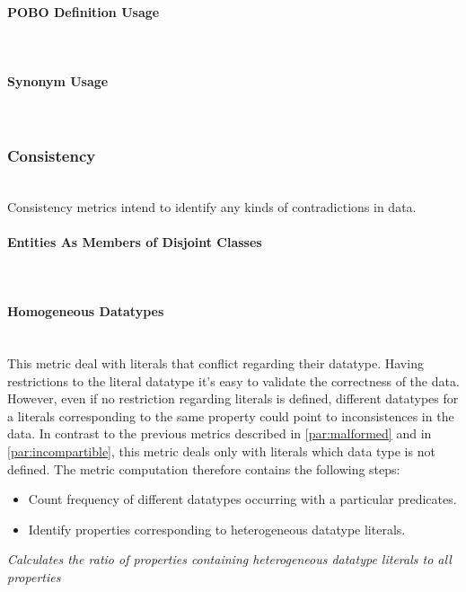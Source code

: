 \paragraph{POBO Definition Usage}~\\ 
\paragraph{Synonym Usage}~\\ 

\subsubsection{Consistency}~\\ 

Consistency metrics intend to identify any kinds of contradictions in data.

\paragraph{Entities As Members of Disjoint Classes}~\\


\paragraph{Homogeneous Datatypes}~\\

This metric deal with literals that conflict regarding their datatype.
Having restrictions to the literal datatype it's easy to validate the correctness of the data.
However, even if no restriction regarding literals is defined, different datatypes for a literals corresponding to the same property could point to inconsistences in the data.
In contrast to the previous metrics described in \ref{par:malformed} and in \ref{par:incompartible}, this metric deals only with literals which data type is  not defined. 
The metric computation therefore contains the following steps:
\begin{itemize}
\item Count frequency of different datatypes occurring with a particular predicates.
\item Identify properties corresponding to heterogeneous datatype literals.
\end{itemize}
\begin{mdframed}[style=metricdefinition]
\emph{Calculates the ratio of properties containing heterogeneous datatype literals to all properties}
\end{mdframed}

